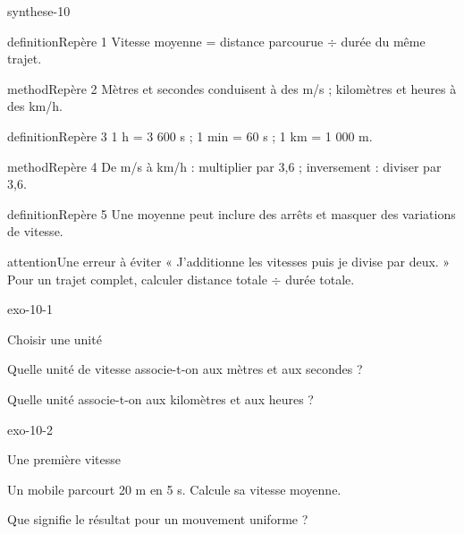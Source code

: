 \documentclass[12pt,twoside,openany]{book}
\begin{document}
\begin{pcFiche}{synthese-10}
\begin{pcEncadre}{definition}{Repère 1}
Vitesse moyenne = distance parcourue \(\div\) durée du même trajet.\par
\end{pcEncadre}
\begin{pcEncadre}{method}{Repère 2}
Mètres et secondes conduisent à des m/s ; kilomètres et heures à des km/h.\par
\end{pcEncadre}
\begin{pcEncadre}{definition}{Repère 3}
1 h = 3 600 s ; 1 min = 60 s ; 1 km = 1 000 m.\par
\end{pcEncadre}
\begin{pcEncadre}{method}{Repère 4}
De m/s à km/h : multiplier par 3,6 ; inversement : diviser par 3,6.\par
\end{pcEncadre}
\begin{pcEncadre}{definition}{Repère 5}
Une moyenne peut inclure des arrêts et masquer des variations de vitesse.\par
\end{pcEncadre}
\begin{pcEncadre}{attention}{Une erreur à éviter}
« J’additionne les vitesses puis je divise par deux. » Pour un trajet complet, calculer distance totale \(\div\) durée totale.\par
\end{pcEncadre}
\end{pcFiche}
\clearpage{}
\begin{blocLivre}{exo-10-1}
\begin{exercice}[1]{Choisir une unité}
\begin{questions}
\item Quelle unité de vitesse associe-t-on aux mètres et aux secondes ?
\item Quelle unité associe-t-on aux kilomètres et aux heures ?
\end{questions}
\end{exercice}\end{blocLivre}
\begin{blocLivre}{exo-10-2}
\begin{exercice}[1]{Une première vitesse}
\begin{questions}
\item Un mobile parcourt 20 m en 5 s. Calcule sa vitesse moyenne.
\item Que signifie le résultat pour un mouvement uniforme ?
\end{questions}
\end{exercice}\end{blocLivre}
\end{document}
